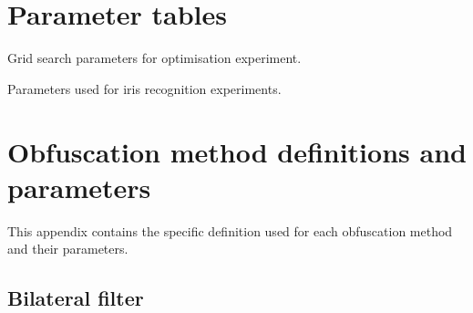 \appendix
\chapter{Parameter tables}
\begin{table}[]
    \centering

    

    \caption{Grid search parameters for optimisation experiment.}
    \label{tab:param-optimisation}
\end{table}

\begin{table}
	
	\caption{Parameters used for iris recognition experiments.}\label{tab:param-recognition}
\end{table}

\chapter{Obfuscation method definitions and parameters}
This appendix contains the specific definition used for each obfuscation method and their parameters.

\section{Bilateral filter}